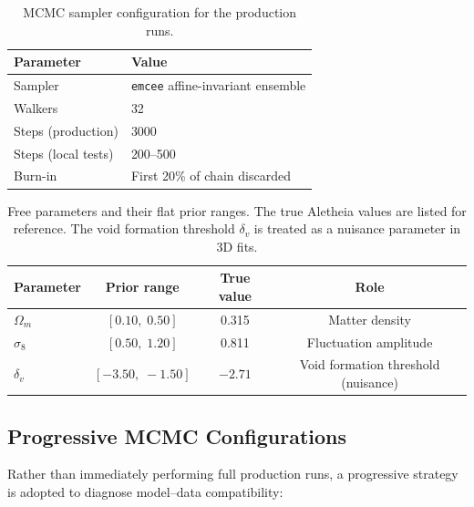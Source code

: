 \documentclass[12pt]{report}
\begin{document}
\begin{table}[H]
    \centering
    \caption{MCMC sampler configuration for the production runs.}
    \label{tab:mcmc_config}
    \begin{tabular}{ll}
        \toprule
        \textbf{Parameter} & \textbf{Value} \\
        \midrule
        Sampler           & \texttt{emcee} affine-invariant ensemble \\
        Walkers           & 32 \\
        Steps (production) & 3000 \\
        Steps (local tests) & 200--500 \\
        Burn-in           & First 20\% of chain discarded \\
        \bottomrule
    \end{tabular}
\end{table}

\begin{table}[H]
    \centering
    \caption{Free parameters and their flat prior ranges. The true Aletheia values are listed for reference. The void formation threshold $\delta_v$ is treated as a nuisance parameter in 3D fits.}
    \label{tab:priors}
    \begin{tabular}{lccc}
        \toprule
        \textbf{Parameter} & \textbf{Prior range} & \textbf{True value} & \textbf{Role} \\
        \midrule
        $\Omega_m$ & $[0.10,\;0.50]$ & 0.315 & Matter density \\
        $\sigma_8$   & $[0.50,\;1.20]$ & 0.811 & Fluctuation amplitude \\
        $\delta_v$   & $[-3.50,\;-1.50]$ & $-2.71$ & Void formation threshold (nuisance) \\
        \bottomrule
    \end{tabular}
\end{table}

\subsection{Progressive MCMC Configurations}

Rather than immediately performing full production runs, a progressive strategy is adopted to diagnose model--data compatibility:
\end{document}
